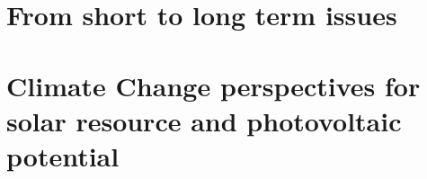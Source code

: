 


\section{From short to long term issues}
\section{Climate Change perspectives for solar resource and photovoltaic potential}

% 